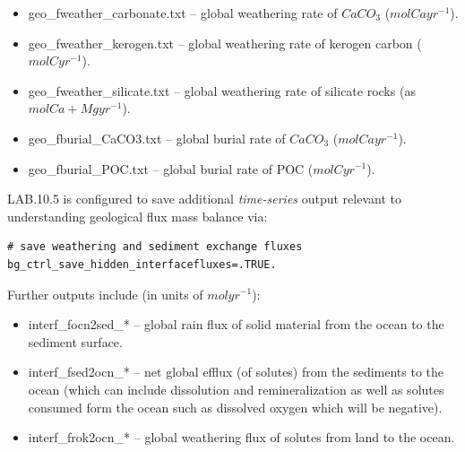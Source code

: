 \begin{itemize}[noitemsep]
\vspace{1mm}
\item \textsf{\footnotesize geo\_fweather\_carbonate.txt} -- global weathering rate of $CaCO_{3}$ ($mol Ca yr^{-1}$).
\vspace{1mm}
\item \textsf{\footnotesize geo\_fweather\_kerogen.txt} -- global weathering rate of kerogen carbon ($mol C yr^{-1}$).
\vspace{1mm}
\item \textsf{\footnotesize geo\_fweather\_silicate.txt} -- global weathering rate of silicate rocks (as $mol Ca+Mg yr^{-1}$).
\vspace{1mm}
\item \textsf{\footnotesize geo\_fburial\_CaCO3.txt} -- global burial rate of $CaCO_{3}$ ($mol Ca yr^{-1}$).
\vspace{1mm}
\item \textsf{\footnotesize geo\_fburial\_POC.txt} -- global burial rate of POC ($mol C yr^{-1}$).
\end{itemize}

\vspace{1mm}
\noindent \textsf{\footnotesize LAB.10.5} is configured to save additional \textit{time-series} output relevant to understanding geological flux mass balance via:
\vspace{-2mm}\small\begin{verbatim}
# save weathering and sediment exchange fluxes
bg_ctrl_save_hidden_interfacefluxes=.TRUE.
\end{verbatim}\normalsize\vspace{-2mm}
Further outputs include (in units of $mol yr^{-1}$):

\begin{itemize}[noitemsep]
\vspace{1mm}
\item \textsf{\footnotesize interf\_focn2sed\_*} -- global rain flux of solid material from the ocean to the sediment surface.
\vspace{1mm}
\item \textsf{\footnotesize interf\_fsed2ocn\_*} -- net global efflux (of solutes) from the sediments to the ocean (which can include dissolution and remineralization as well as solutes consumed form the ocean such as dissolved oxygen which will be negative).
\vspace{1mm}
\item \textsf{\footnotesize interf\_frok2ocn\_*} -- global weathering flux of solutes from land to the ocean.
\end{itemize}

